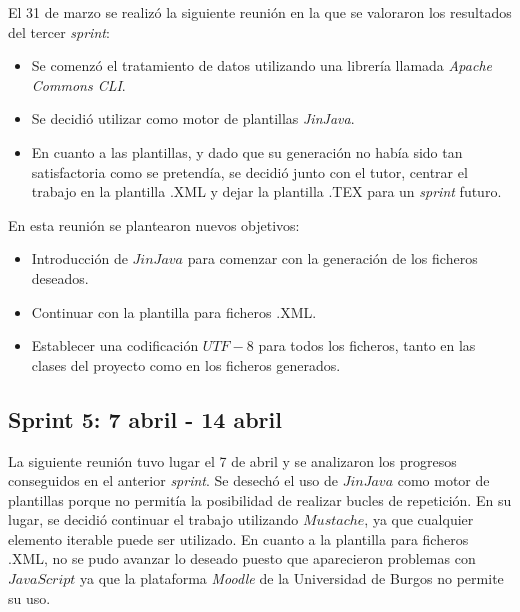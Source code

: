 El 31 de marzo se realizó la siguiente reunión en la que se valoraron los resultados del tercer \textit{sprint}:
\begin{itemize}
\item Se comenzó el tratamiento de datos utilizando una librería llamada \textit{Apache Commons CLI}.
\item Se decidió utilizar como motor de plantillas \textit{JinJava}. 
\item En cuanto a las plantillas, y dado que su generación no había sido tan satisfactoria como se pretendía, se decidió junto con el tutor, centrar el trabajo en la plantilla .XML y dejar la plantilla .TEX para un \textit{sprint} futuro.
\end{itemize}

En esta reunión se plantearon nuevos objetivos:
\begin{itemize}
\item Introducción de $JinJava$ para comenzar con la generación de los ficheros deseados.
\item Continuar con la plantilla para ficheros .XML.
\item Establecer una codificación $UTF-8$ para todos los ficheros, tanto en las clases del proyecto como en los ficheros generados.
\end{itemize}

 

\subsection{Sprint 5: 7 abril - 14 abril}
La siguiente reunión tuvo lugar el 7 de abril y se analizaron los progresos conseguidos en el anterior \textit{sprint}. Se desechó el uso de $JinJava$ como motor de plantillas porque no permitía la posibilidad de realizar bucles de repetición. En su lugar, se decidió continuar el trabajo utilizando $Mustache$, ya que cualquier elemento iterable puede ser utilizado. En cuanto a la plantilla para ficheros .XML, no se pudo avanzar lo deseado puesto que aparecieron problemas con $JavaScript$ ya que la plataforma \textit{Moodle} de la Universidad de Burgos no permite su uso.

